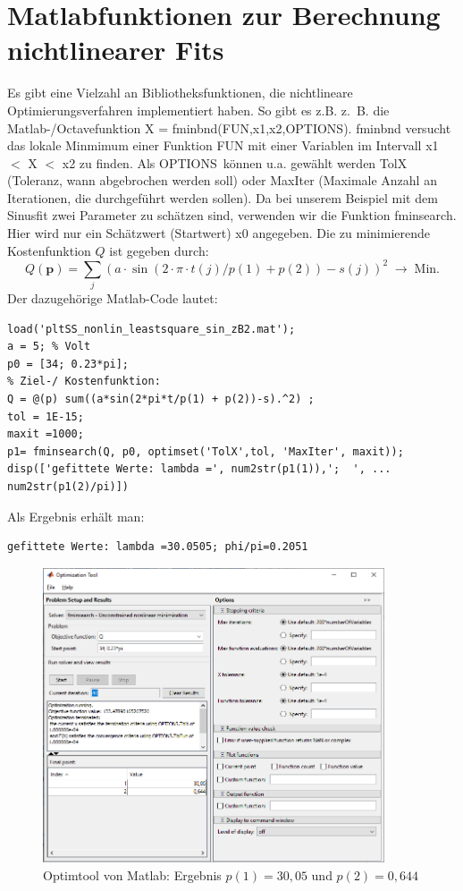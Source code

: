 \section{Matlabfunktionen zur Berechnung nichtlinearer Fits}
Es gibt eine Vielzahl an Bibliotheksfunktionen, die nichtlineare Optimierungsverfahren implementiert haben. So gibt es z.B. 
z.~B. die Matlab-/Octavefunktion \newline \textsf{X = fminbnd(FUN,x1,x2,OPTIONS)}.
\textsf{fminbnd} versucht das lokale Minmimum einer Funktion \textsf{FUN} mit einer
Variablen im Intervall \textrm{x1 $<$ X $<$ x2} zu finden.  
Als \glq OPTIONS\grq~können u.a. gewählt werden TolX (Toleranz, wann abgebrochen
werden soll) oder MaxIter (Maximale Anzahl an Iterationen, die durchgeführt
werden sollen).
Da bei unserem Beispiel mit dem Sinusfit zwei Parameter zu schätzen sind, 
verwenden wir die Funktion \textsf{fminsearch}. Hier wird nur ein Schätzwert (Startwert) 
\textrm{x0} angegeben. Die zu minimierende Kostenfunktion $Q$ ist gegeben durch: 
\begin{equation}
Q(\boldsymbol{p}) = \sum_j (a \cdot \sin(2\cdot \pi \cdot t(j) /p(1) + p(2))-s(j))^2
\;\rightarrow \;\textrm{Min.}
\end{equation}
Der dazugehörige Matlab-Code lautet: 
\begin{verbatim}
load('pltSS_nonlin_leastsquare_sin_zB2.mat');
a = 5; % Volt
p0 = [34; 0.23*pi];
% Ziel-/ Kostenfunktion:
Q = @(p) sum((a*sin(2*pi*t/p(1) + p(2))-s).^2) ;
tol = 1E-15;
maxit =1000;
p1= fminsearch(Q, p0, optimset('TolX',tol, 'MaxIter', maxit));
disp(['gefittete Werte: lambda =', num2str(p1(1)),';  ', ...
num2str(p1(2)/pi)])
\end{verbatim}
Als Ergebnis erhält man: 
\begin{verbatim}
gefittete Werte: lambda =30.0505; phi/pi=0.2051
\end{verbatim}
\begin{figure}[htb]
	\begin{center}
		\includegraphics[width=0.9\textwidth, angle = 0]{03_vorlesung/media/OptimToolMatlab.png}
	\end{center}
	\caption{Optimtool von Matlab: Ergebnis $p(1)=30,05$ und $p(2)=0,644$} \label{fig:Optimtool_von_Matlab}
\end{figure}


